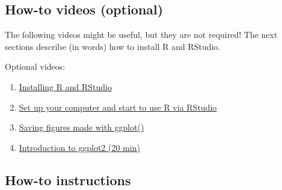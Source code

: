 \documentclass[
  letterpaper,
  DIV=11,
  numbers=noendperiod]{scrreprt}
\providecommand{\tightlist}{%
  \setlength{\itemsep}{0pt}\setlength{\parskip}{0pt}}
\begin{document}
\subsection{How-to videos (optional)}\label{how-to-videos-optional}

The following videos might be useful, but they are not required! The
next sections describe (in words) how to install R and RStudio.

Optional videos:

\begin{enumerate}
\def\labelenumi{\arabic{enumi}.}
\tightlist
\item
  \href{https://youtu.be/4KcNgXS1CUw}{Installing R and RStudio}
\item
  \href{https://youtu.be/vf5El6FVwpw}{Set up your computer and start to
  use R via RStudio}
\item
  \href{https://youtu.be/p4uT6ycJEjw}{Saving figures made with ggplot()}
\item
  \href{https://youtu.be/uS0_OH8fRls}{Introduction to ggplot2 (20 min)}
\end{enumerate}

\subsection{How-to instructions}\label{how-to-instructions}
\end{document}

